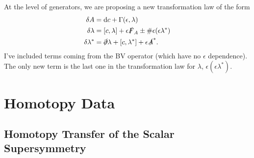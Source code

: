 \documentclass[10pt, oneside]{article}
\renewcommand{\d}{\mathrm{d}}
\begin{document}
At the level of generators, we are proposing a new transformation law of the form 
\begin{align*}
\delta A &= \d c + \Gamma(\epsilon,\lambda) \\
\delta \lambda &= [c,\lambda] + \epsilon \sd F_A  \pm \# \epsilon (\epsilon \lambda^*)  \\
\delta \lambda^* &= \sd \partial \lambda + [c, \lambda^*] + \epsilon \sd A^*  .
\end{align*}
I've included terms coming from the BV operator (which have no $\epsilon$ dependence). 
The only new term is the last one in the transformation law for $\lambda$, $\epsilon (\epsilon \lambda^*)$. 

\section{Homotopy Data}

\subsection{Homotopy Transfer of the Scalar Supersymmetry}



\pagestyle{bib}
\printbibliography
\end{document}
